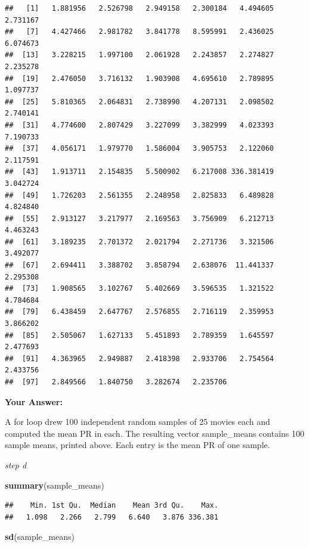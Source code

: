 \documentclass[
]{article}
\newenvironment{Shaded}{\begin{snugshade}}{\end{snugshade}}
\newcommand{\FunctionTok}[1]{\textcolor[rgb]{0.13,0.29,0.53}{\textbf{#1}}}
\newcommand{\NormalTok}[1]{#1}
\begin{document}
\begin{verbatim}
##   [1]   1.881956   2.526798   2.949158   2.300184   4.494605   2.731167
##   [7]   4.427466   2.981782   3.841778   8.595991   2.436025   6.074673
##  [13]   3.228215   1.997100   2.061928   2.243857   2.274827   2.235278
##  [19]   2.476050   3.716132   1.903908   4.695610   2.789895   1.097737
##  [25]   5.810365   2.064831   2.738990   4.207131   2.098502   2.740141
##  [31]   4.774600   2.807429   3.227099   3.382999   4.023393   7.190733
##  [37]   4.056171   1.979770   1.586004   3.905753   2.122060   2.117591
##  [43]   1.913711   2.154835   5.500902   6.217008 336.381419   3.042724
##  [49]   1.726203   2.561355   2.248958   2.825833   6.489828   4.824840
##  [55]   2.913127   3.217977   2.169563   3.756909   6.212713   4.463243
##  [61]   3.189235   2.701372   2.021794   2.271736   3.321506   3.492077
##  [67]   2.694411   3.388702   3.858794   2.638076  11.441337   2.295308
##  [73]   1.908565   3.102767   5.402669   3.596535   1.321522   4.784684
##  [79]   6.438459   2.647767   2.576855   2.716119   2.359953   3.866202
##  [85]   2.505067   1.627133   5.451893   2.789359   1.645597   2.477693
##  [91]   4.363965   2.949887   2.418398   2.933706   2.754564   2.433756
##  [97]   2.849566   1.840750   3.282674   2.235706
\end{verbatim}

\textbf{Your Answer:}

A for loop drew 100 independent random samples of 25 movies each and
computed the mean PR in each. The resulting vector sample\_means
contains 100 sample means, printed above. Each entry is the mean PR of
one sample.

\emph{step d}

\begin{Shaded}
\begin{Highlighting}[]
\FunctionTok{summary}\NormalTok{(sample\_means)}
\end{Highlighting}
\end{Shaded}

\begin{verbatim}
##    Min. 1st Qu.  Median    Mean 3rd Qu.    Max. 
##   1.098   2.266   2.799   6.640   3.876 336.381
\end{verbatim}

\begin{Shaded}
\begin{Highlighting}[]
\FunctionTok{sd}\NormalTok{(sample\_means)}
\end{Highlighting}
\end{Shaded}
\end{document}
